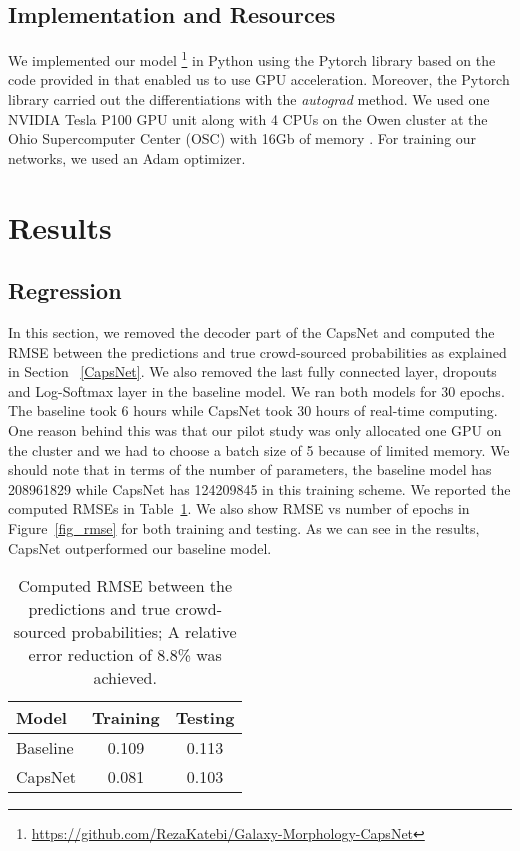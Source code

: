 \documentclass[a4paper,fleqn,usenatbib]{mnras}
\begin{document}
\subsection{Implementation and Resources}  
We implemented our model \footnote{\url{https://github.com/RezaKatebi/Galaxy-Morphology-CapsNet}} in Python using the Pytorch library based on the code provided in \cite{gram-ai_2018} that enabled us to use GPU acceleration. Moreover, the Pytorch library  carried out the differentiations with the \textit{autograd} method. We used one NVIDIA Tesla P100 GPU unit along with 4 CPUs on the Owen cluster at the Ohio Supercomputer Center (OSC) with 16Gb of memory \citep{OhioSupercomputerCenter1987}. For training our networks, we used an Adam optimizer. 

\section{Results}

\subsection{Regression}
In this section, we removed the decoder part of the CapsNet and computed the RMSE between the predictions and true crowd-sourced probabilities as explained in  Section ~\ref{CapsNet}. We also removed the last fully connected layer, dropouts and Log-Softmax layer in the baseline model. We ran both models for 30 epochs. The baseline took 6 hours while CapsNet took 30 hours of real-time computing. One reason behind this was that our pilot study was only allocated one GPU on the cluster and we had to choose a batch size of 5 because of limited memory. We should note that in terms of the number of parameters, the baseline model has  \num[group-separator={,}]{208961829} while CapsNet has \num[group-separator={,}]{124209845} in this training scheme. We reported the computed RMSEs in Table~\ref{RMSE_Tab}. We also show RMSE vs number of epochs in Figure~\ref{fig_rmse} for both training and testing.  As we can see in the results, CapsNet outperformed our baseline model. 

\begin{table}
\centering
 \begin{tabular}{lcc}
  \hline
  Model & Training  & Testing\\
  \hline
  Baseline  & 0.109 & 0.113\\
 CapsNet &  0.081 & 0.103\\
  \hline
 \end{tabular}
 \caption{Computed RMSE between the predictions and true crowd-sourced probabilities; A relative error reduction of 8.8\% was achieved.}
  \label{RMSE_Tab}
\end{table}
 
\end{document}
